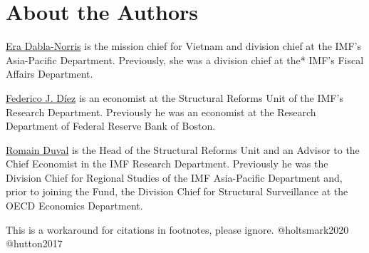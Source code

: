\hypertarget{about-the-authors-9}{%
\section*{About the Authors}\label{about-the-authors-9}}

\href{https://www.imf.org/external/np/cv/AuthorCV.aspx?AuthID=299}{Era Dabla-Norris} is the mission chief for Vietnam and division chief at the IMF's Asia-Pacific Department. Previously, she was a division chief at the* IMF's Fiscal Affairs Department.

\href{https://www.imf.org/external/np/cv/AuthorCV.aspx?AuthID=311}{Federico J. Díez} is an economist at the Structural Reforms Unit of the IMF's Research Department. Previously he was an economist at the Research Department of Federal Reserve Bank of Boston.

\href{https://www.imf.org/external/np/cv/AuthorCV.aspx?AuthID=291}{Romain Duval} is the Head of the Structural Reforms Unit and an Advisor to the Chief Economist in the IMF Research Department. Previously he was the Division Chief for Regional Studies of the IMF Asia-Pacific Department and, prior to joining the Fund, the Division Chief for Structural Surveillance at the OECD Economics Department.

\begin{invisible}
This is a workaround for citations in footnotes, please ignore.
@holtsmark2020 @hutton2017
\end{invisible}

\putbib

